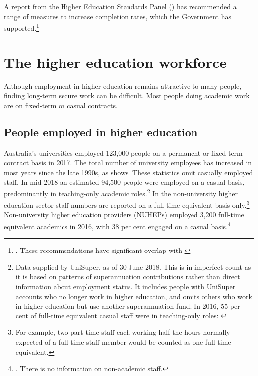 \documentclass{grattan}
\begin{document}
A report from the Higher Education Standards Panel () has recommended a range of measures to increase completion rates, which the Government has supported.\footnote{\textcite[][]{HESP2018finalreportimpr}. These recommendations have significant overlap with \textcite[][chapters~5~to~8.]{Norton2018droppingouttheb}}

%


%
\chapter{The higher education workforce}\label{chap:the-higher-education-workforce}

%


Although employment in higher education remains attractive to many people, finding long-term secure work can be difficult. Most people doing academic work are on fixed-term or casual contracts.

%
\section{People employed in higher education }\label{sec:people-employed-in-higher-education}

Australia's universities employed 123,000 people on a permanent or fixed-term contract basis in 2017. The total number of university employees has increased in most years since the late 1990s, as  shows. These statistics omit casually employed staff. In mid-2018 an estimated 94,500 people were employed on a casual basis, predominantly in teaching-only academic roles.\footnote{Data supplied by UniSuper, as of 30 June 2018. This is in imperfect count as it is based on patterns of superannuation contributions rather than direct information about employment status. It includes people with UniSuper accounts who no longer work in higher education, and omits others who work in higher education but use another superannuation fund. In 2016, 55 per cent of full-time equivalent casual staff were in teaching-only roles: \textcite[][appendix~1.7.]{DepartmentofEducationandTraining2017studentsselected}} In the non-university higher education sector staff numbers are reported on a full-time equivalent basis only.\footnote{For example, two part-time staff each working half the hours normally expected of a full-time staff member would be counted as one full-time equivalent.} Non-university higher education providers (NUHEPs) employed 3,200 full-time equivalent academics in 2016, with 38 per cent engaged on a casual basis.\footnote{\textcite[][42]{TEQSA2018teqsasriskassess}. There is no information on non-academic staff.}
\end{document}
